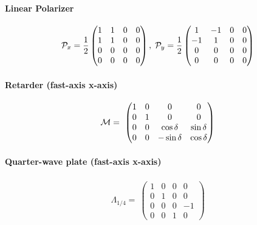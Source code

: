 \paragraph{Linear Polarizer}
\begin{align}
\mathcal{P}_x=\frac{1}{2}
\begin{pmatrix}
    1 & 1 & 0 & 0 \\
    1 & 1 & 0 & 0 \\
    0 & 0 & 0 & 0 \\
    0 & 0 & 0 & 0
  \end{pmatrix}
, \;
\mathcal{P}_y=\frac{1}{2}
\begin{pmatrix}
     1 & -1 & 0 & 0 \\
    -1 &  1 & 0 & 0 \\
     0 &  0 & 0 & 0 \\
     0 &  0 & 0 & 0
\end{pmatrix}
\end{align}
%
\paragraph{Retarder (fast-axis x-axis)}
\begin{align}
\mathcal{M}=\
\begin{pmatrix}
    1 & 0 & 0 &  0 \\
    0 & 1 & 0 &  0 \\
    0 & 0 & \cos \delta & \sin \delta \\
    0 & 0 & -\sin \delta &  \cos \delta
\end{pmatrix}
\end{align}
%
\paragraph{Quarter-wave plate (fast-axis x-axis)}
\begin{align}
\Lambda_{1/4}=\
\begin{pmatrix}
    1 & 0 & 0 &  0 \\
    0 & 1 & 0 &  0 \\
    0 & 0 & 0 & -1 \\
    0 & 0 & 1 &  0
\end{pmatrix}
\end{align}
%
